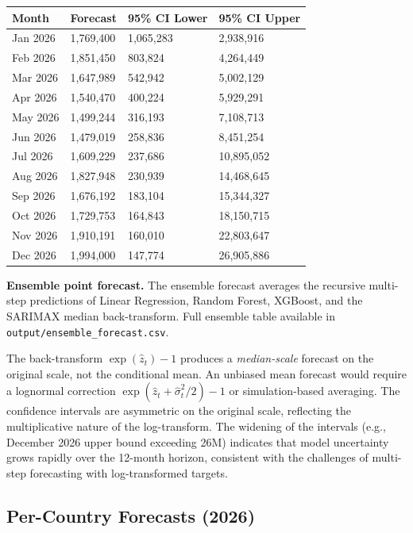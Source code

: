 \documentclass[
]{article}
\begin{document}
\begin{longtable}[]{@{}llll@{}}
\toprule\noalign{}
Month & Forecast & 95\% CI Lower & 95\% CI Upper \\
\midrule\noalign{}
\endhead
\bottomrule\noalign{}
\endlastfoot
Jan 2026 & 1,769,400 & 1,065,283 & 2,938,916 \\
Feb 2026 & 1,851,450 & 803,824 & 4,264,449 \\
Mar 2026 & 1,647,989 & 542,942 & 5,002,129 \\
Apr 2026 & 1,540,470 & 400,224 & 5,929,291 \\
May 2026 & 1,499,244 & 316,193 & 7,108,713 \\
Jun 2026 & 1,479,019 & 258,836 & 8,451,254 \\
Jul 2026 & 1,609,229 & 237,686 & 10,895,052 \\
Aug 2026 & 1,827,948 & 230,939 & 14,468,645 \\
Sep 2026 & 1,676,192 & 183,104 & 15,344,327 \\
Oct 2026 & 1,729,753 & 164,843 & 18,150,715 \\
Nov 2026 & 1,910,191 & 160,010 & 22,803,647 \\
Dec 2026 & 1,994,000 & 147,774 & 26,905,886 \\
\end{longtable}

\textbf{Ensemble point forecast.} The ensemble forecast averages the
recursive multi-step predictions of Linear Regression, Random Forest,
XGBoost, and the SARIMAX median back-transform. Full ensemble table
available in \texttt{output/ensemble\_forecast.csv}.

The back-transform \(\exp(\hat{z}_t) - 1\) produces a
\emph{median-scale} forecast on the original scale, not the conditional
mean. An unbiased mean forecast would require a lognormal correction
\(\exp(\hat{z}_t + \hat{\sigma}^2_t/2) - 1\) or simulation-based
averaging. The confidence intervals are asymmetric on the original
scale, reflecting the multiplicative nature of the log-transform. The
widening of the intervals (e.g., December 2026 upper bound exceeding
26M) indicates that model uncertainty grows rapidly over the 12-month
horizon, consistent with the challenges of multi-step forecasting with
log-transformed targets.

\subsection{Per-Country Forecasts
(2026)}\label{per-country-forecasts-2026}
\end{document}
